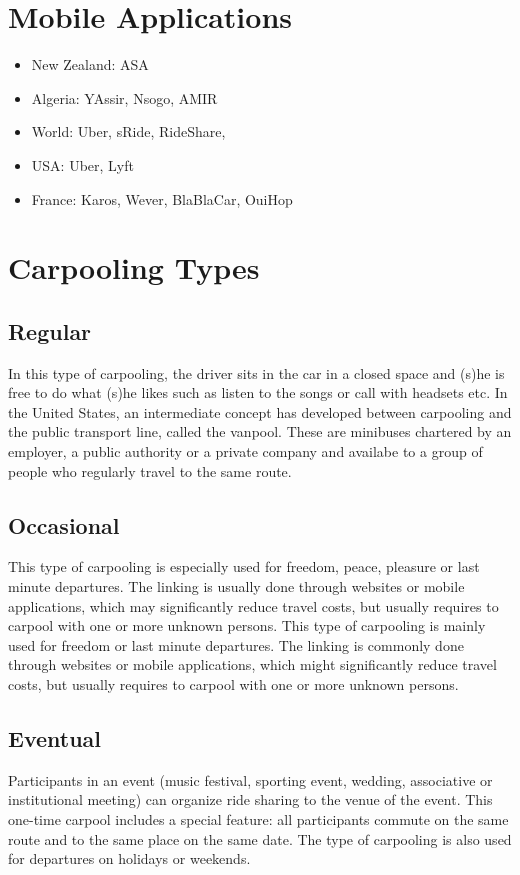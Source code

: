 \section{Mobile Applications}
\begin{itemize}
	
	\item New Zealand: ASA
	\item Algeria: YAssir, Nsogo, AMIR
	\item World: Uber, sRide, RideShare, 
	\item USA: Uber, Lyft
	\item France: Karos, Wever, BlaBlaCar, OuiHop

\end{itemize}

\section{Carpooling Types}
\subsection{Regular}
In this type of carpooling, the driver sits in the car in a closed space and (s)he is free to do what (s)he likes such as listen to the songs or call with headsets etc. In the United States, an intermediate concept has developed between carpooling and the public transport line, called the vanpool. These are minibuses chartered by an employer, a public authority or a private company and availabe to a group of people who regularly travel to the same route.

\subsection{Occasional}
This type of carpooling is especially used for freedom, peace, pleasure or last minute departures. The linking is usually done through websites or mobile applications, which may signiﬁcantly reduce travel costs, but usually requires to carpool with one or more unknown persons. This type of carpooling is mainly used for freedom or last minute departures. The linking is commonly done through websites or mobile applications, which might signiﬁcantly reduce travel costs, but usually requires to carpool with one or more unknown persons.

\subsection{Eventual}
Participants in an event (music festival, sporting event, wedding, associative or institutional meeting) can organize ride sharing to the venue of the event. This one-time carpool includes a special feature: all participants commute on the same route and to the same place on the same date. The type of carpooling is also used for departures on holidays or weekends.\\

